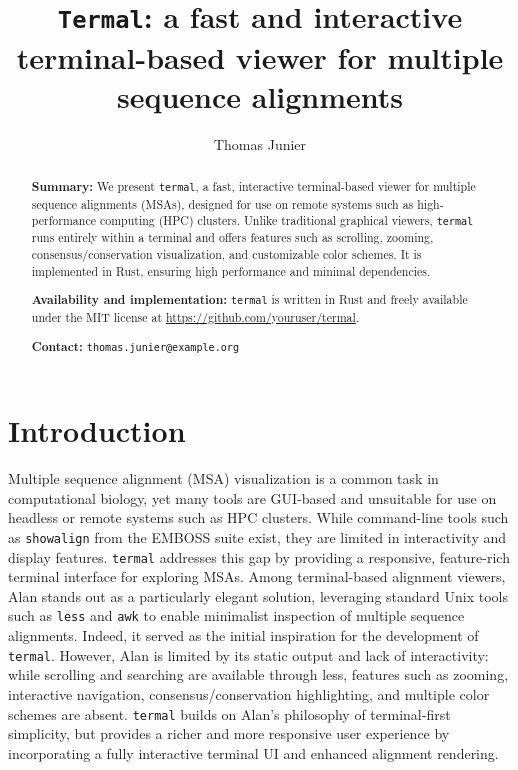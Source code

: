 \documentclass[11pt]{article}
\title{%
\texttt{Termal}: a fast and interactive terminal-based viewer for multiple sequence alignments
}
\author[1]{Thomas Junier}
\affil[1]{Swiss Institute of Bioinformatics, Vital-\textsc{it} Group, Switzerland\\
\texttt{thomas.junier@sib.swiss}}
\date{} %
\begin{document}
\maketitle

\begin{abstract} \textbf{Summary:} We present \texttt{termal}, a fast,
  interactive terminal-based viewer for multiple sequence alignments (MSAs),
  designed for use on remote systems such as high-performance computing (HPC)
  clusters. Unlike traditional graphical viewers, \texttt{termal} runs entirely
  within a terminal and offers features such as scrolling, zooming,
  consensus/conservation visualization, and customizable color schemes. It is
  implemented in Rust, ensuring high performance and minimal dependencies.

  \textbf{Availability and implementation:} \texttt{termal} is written in Rust
  and freely available under the MIT license at
  \url{https://github.com/youruser/termal}.

\textbf{Contact:} \texttt{thomas.junier@example.org}
\end{abstract}

\section*{Introduction}

Multiple sequence alignment (MSA) visualization is a common task in
computational biology, yet many tools are GUI-based and unsuitable for use on
headless or remote systems such as HPC clusters. While command-line tools such
as \texttt{showalign} from the EMBOSS suite\cite{emboss} exist, they are limited
in interactivity and display features. \texttt{termal} addresses this gap by
providing a responsive, feature-rich terminal interface for exploring MSAs.
Among terminal-based alignment viewers, Alan\cite{alan} stands out as a
particularly elegant solution, leveraging standard Unix tools such as
\texttt{less} and \texttt{awk} to enable minimalist inspection of multiple
sequence alignments. Indeed, it served as the initial inspiration for the
development of \texttt{termal}. However, Alan is limited by its static output and lack of
interactivity: while scrolling and searching are available through less,
features such as zooming, interactive navigation, consensus/conservation
highlighting, and multiple color schemes are absent.  \texttt{termal} builds on Alan’s
philosophy of terminal-first simplicity, but provides a richer and more
responsive user experience by incorporating a fully interactive terminal UI and
enhanced alignment rendering.
\end{document}
